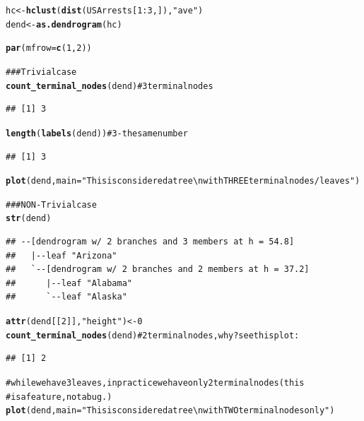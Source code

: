 \documentclass[shortnames,nojss,article]{jss}\usepackage{graphicx, color}
\makeatletter
\newcommand{\hlfunctioncall}[1]{\textcolor[rgb]{0.501960784313725,0,0.329411764705882}{\textbf{#1}}}%
\newcommand{\hlstring}[1]{\textcolor[rgb]{0.6,0.6,1}{#1}}%
\newcommand{\hlcomment}[1]{\textcolor[rgb]{0.180392156862745,0.6,0.341176470588235}{#1}}%
\newenvironment{kframe}{%
 \def\at@end@of@kframe{}%
 \ifinner\ifhmode%
  \def\at@end@of@kframe{\end{minipage}}%
  \begin{minipage}{\columnwidth}%
 \fi\fi%
 \def\FrameCommand##1{\hskip\@totalleftmargin \hskip-\fboxsep
 \colorbox{shadecolor}{##1}\hskip-\fboxsep
     \hskip-\linewidth \hskip-\@totalleftmargin \hskip\columnwidth}%
 \MakeFramed {\advance\hsize-\width
   \@totalleftmargin\z@ \linewidth\hsize
   \@setminipage}}%
 {\par\unskip\endMakeFramed%
 \at@end@of@kframe}
\newenvironment{knitrout}{}{} %
\makeatother
\begin{document}
\begin{knitrout}
\color{fgcolor}\begin{kframe}
\begin{alltt}

hc <- \hlfunctioncall{hclust}(\hlfunctioncall{dist}(USArrests[1:3, ]), \hlstring{"ave"})
dend <- \hlfunctioncall{as.dendrogram}(hc)

\hlfunctioncall{par}(mfrow = \hlfunctioncall{c}(1, 2))

\hlcomment{### Trivial case}
\hlfunctioncall{count_terminal_nodes}(dend)  \hlcomment{# 3 terminal nodes}
\end{alltt}
\begin{verbatim}
## [1] 3
\end{verbatim}
\begin{alltt}
\hlfunctioncall{length}(\hlfunctioncall{labels}(dend))  \hlcomment{# 3 - the same number}
\end{alltt}
\begin{verbatim}
## [1] 3
\end{verbatim}
\begin{alltt}
\hlfunctioncall{plot}(dend, main = \hlstring{"This is considered a tree \textbackslash{}n with THREE terminal nodes/leaves"})

\hlcomment{### NON-Trivial case}
\hlfunctioncall{str}(dend)
\end{alltt}
\begin{verbatim}
## --[dendrogram w/ 2 branches and 3 members at h = 54.8]
##   |--leaf "Arizona" 
##   `--[dendrogram w/ 2 branches and 2 members at h = 37.2]
##      |--leaf "Alabama" 
##      `--leaf "Alaska"
\end{verbatim}
\begin{alltt}
\hlfunctioncall{attr}(dend[[2]], \hlstring{"height"}) <- 0
\hlfunctioncall{count_terminal_nodes}(dend)  \hlcomment{# 2 terminal nodes, why? see this plot:}
\end{alltt}
\begin{verbatim}
## [1] 2
\end{verbatim}
\begin{alltt}
\hlcomment{# while we have 3 leaves, in practice we have only 2 terminal nodes (this}
\hlcomment{# is a feature, not a bug.)}
\hlfunctioncall{plot}(dend, main = \hlstring{"This is considered a tree \textbackslash{}n with TWO terminal nodes only"})
\end{alltt}
\end{kframe}


\end{knitrout}
\end{document}
